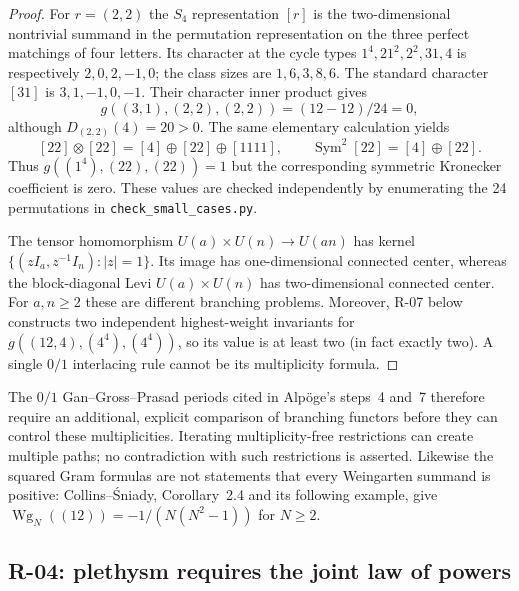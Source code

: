 \documentclass[11pt,a4paper]{article}
\theoremstyle{definition}\newtheorem{definition}{Definition}
\begin{document}
\begin{proof}
For $r=(2,2)$ the $S_4$ representation $[r]$ is the two-dimensional
nontrivial summand in the permutation representation on the three
perfect matchings of four letters. Its character at the cycle types
$1^4,21^2,2^2,31,4$ is respectively $2,0,2,-1,0$; the class sizes are
$1,6,3,8,6$. The standard character $[31]$ is $3,1,-1,0,-1$.
Their character inner product gives
\[
 g((3,1),(2,2),(2,2))=(12-12)/24=0,
\]
although $D_{(2,2)}(4)=20>0$. The same elementary calculation yields
\[
 [22]\otimes[22]=[4]\oplus[22]\oplus[1111],\qquad
 \operatorname{Sym}^2[22]=[4]\oplus[22].
\]
Thus $g((1^4),(22),(22))=1$ but the corresponding symmetric Kronecker
coefficient is zero. These values are checked independently by enumerating
the 24 permutations in \texttt{check\_small\_cases.py}.

The tensor homomorphism $U(a)\times U(n)\longrightarrow U(an)$ has kernel
$\{(zI_a,z^{-1}I_n):|z|=1\}$. Its image has one-dimensional connected
center, whereas the block-diagonal Levi $U(a)\times U(n)$ has
two-dimensional connected center. For $a,n\geq2$ these are different
branching problems. Moreover, R-07 below constructs two independent
highest-weight invariants for $g((12,4),(4^4),(4^4))$, so its value is at
least two (in fact exactly two). A single $0/1$ interlacing rule cannot
be its multiplicity formula.
\end{proof}

The $0/1$ Gan--Gross--Prasad periods cited in Alp\"oge's steps~4 and~7
therefore require an additional, explicit comparison of branching
functors before they can control these multiplicities. Iterating
multiplicity-free restrictions can create multiple paths; no
contradiction with such restrictions is asserted. Likewise the squared
Gram formulas are not statements that every Weingarten summand is
positive: Collins--\'Sniady, Corollary~2.4 and its following example, give
$\operatorname{Wg}_N((12))=-1/(N(N^2-1))$ for $N\geq2$.

\subsection{R-04: plethysm requires the joint law of powers}
\end{document}
